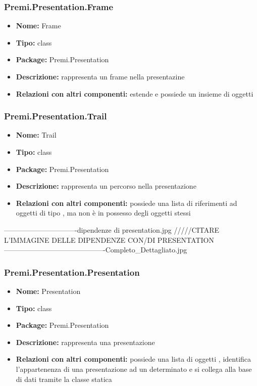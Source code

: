 \subsubsection{Premi.Presentation.Frame}
\begin{itemize}
  \item \textbf{Nome:} Frame
  \item \textbf{Tipo:} class
  \item \textbf{Package:} Premi.Presentation
  \item \textbf{Descrizione:} rappresenta un frame nella presentazine
  \item \textbf{Relazioni con altri componenti:} estende  e possiede un insieme di oggetti  
\end{itemize}
\subsubsection{Premi.Presentation.Trail}
\begin{itemize}
  \item \textbf{Nome:} Trail
  \item \textbf{Tipo:} class
  \item \textbf{Package:} Premi.Presentation
  \item \textbf{Descrizione:} rappresenta un percorso nella presentazione
  \item \textbf{Relazioni con altri componenti:} possiede una lista di riferimenti ad oggetti di tipo , ma non è in possesso degli oggetti stessi
\end{itemize}
-------------------------------dipendenze di presentation.jpg /////CITARE L'IMMAGINE DELLE DIPENDENZE CON/DI PRESENTATION
-------------------------------------------Completo_Dettagliato.jpg
\subsubsection{Premi.Presentation.Presentation}
\begin{itemize}
  \item \textbf{Nome:} Presentation
  \item \textbf{Tipo:} class
  \item \textbf{Package:} Premi.Presentation
  \item \textbf{Descrizione:} rappresenta una presentazione
  \item \textbf{Relazioni con altri componenti:} possiede una lista di oggetti , identifica l'appartenenza di una presentazione ad un determinato  e si collega alla base di dati tramite la classe statica 
\end{itemize}



